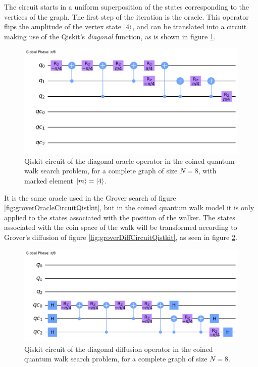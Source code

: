 \documentclass[../../dissertation.tex]{subfiles}
\begin{document}
The circuit starts in a uniform superposition of the states corresponding to
the vertices of the graph. The first step of the iteration is the oracle.
This operator flips the amplitude of the vertex state $\ket{4}$, and can be
translated into a circuit making use of the Qiskit's \textit{diagonal} function, as is shown
in figure \ref{fig:coinedQWSearchOracleCircuitQistkit}. 
\begin{figure}[!h]
	\centering
	\includegraphics[scale=0.30]{img/Qiskit/CoinedQuantumWalk/Search/Circuits/CoinedSearchQiskitCircOracle_N3_M4_S5.png}
	\caption{Qiskit circuit of the  diagonal oracle operator in the coined quantum walk search problem, for a complete graph of size $N=8$, with marked element $\ket{m}=\ket{4}$.} 
	\label{fig:coinedQWSearchOracleCircuitQistkit}
\end{figure}
It is the same oracle used in the Grover search of figure
\ref{fig:groverOracleCircuitQistkit}, but in the coined quantum walk model it
is only applied to the states associated with the position of the walker. The
states associated with the coin space of the walk will be transformed according
to Grover's diffusion of figure \ref{fig:groverDiffCircuitQistkit}, as seen
in figure \ref{fig:coinedQWSearchDiffCircuitQistkit}. 
\begin{figure}[!h]
	\centering
	\includegraphics[scale=0.30]{img/Qiskit/CoinedQuantumWalk/Search/Circuits/CoinedSearchQiskitCircDiff_N3_M4_S5.png}
	\caption{Qiskit circuit of the  diagonal diffusion operator in the coined quantum walk search problem, for a complete graph of size $N=8$.} 
	\label{fig:coinedQWSearchDiffCircuitQistkit}
\end{figure}\par
\end{document}
